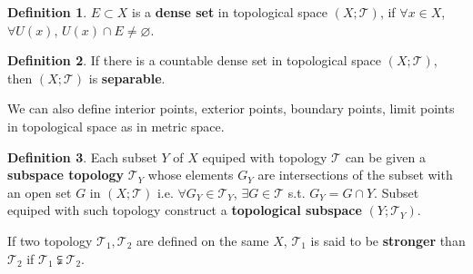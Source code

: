 \documentclass{article}
\theoremstyle{plain}
\theoremstyle{definition}
\newtheorem{dfn}{Definition}[section] %
\begin{document}
\begin{dfn}\label{dense_set}
$E\subset X$ is a \textbf{dense set} in topological space $(X;\mathscr{T})$, if $\forall x\in X$, $\forall U(x)$, $U(x)\cap E\neq \varnothing$.
\end{dfn}
\begin{dfn}\label{separable}
If there is a countable dense set in topological space $(X;\mathscr{T})$, then $(X;\mathscr{T})$ is \textbf{separable}.
\end{dfn}
We can also define interior points, exterior points, boundary points, limit points in topological space as in metric space.
\begin{dfn}\label{subspace_topology}
Each subset $Y$ of $X$ equiped with topology $\mathscr{T}$ can be given a \textbf{subspace topology} $\mathscr{T}_Y$ whose elements $G_Y$ are intersections of the subset with an open set $G$ in $(X;\mathscr{T})$ i.e. $\forall G_Y\in \mathscr{T}_Y$, $\exists G\in \mathscr{T}$ s.t. $G_Y=G\cap Y$. Subset equiped with such topology construct a \textbf{topological subspace} $(Y;\mathscr{T}_Y)$. 
\end{dfn}
If two topology $\mathscr{T}_1,\mathscr{T}_2$ are defined on the same $X$, $\mathscr{T}_1$ is said to be \textbf{stronger} than $\mathscr{T}_2$ if $\mathscr{T}_1\subsetneqq \mathscr{T}_2$.
\end{document}
